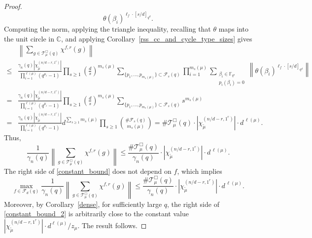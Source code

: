 \documentclass[Unicode,ALCO]{cedram}
\newcommand{\Cbb}{\mathbb{C}}
\newcommand{\F}{\mathbb{F}}
\newcommand{\CF}{\mathcal{F}}
\newcommand{\CT}{\mathcal{T}}
\newcommand{\te}{\theta}
\begin{document}
\begin{proof}
\begin{equation}
\te(\beta_i)^{\ell_f \cdot [s/d]_{q^d}}.
\end{equation}
Computing the norm, applying the triangle inequality, recalling that \(\te\) maps into the unit circle in \(\Cbb\), and applying Corollary~\ref{rss_cc_and_cycle_type_sizes} gives
\begin{align*}
& \left \|
\sum_{g \in \CT^\Box_\mu (q)} \chi^{f,r} (g)
\right \| \\
\leq &
\frac{\gamma_n(q) \left | \chi^{(n/d-r,1^r)}_{\tilde{\mu}} \right |}{\prod_{i=1}^{\ell(\mu)} (q^{\mu_i}-1)}
\prod_{s \geq 1}
\left (
\frac{d}{s}
\right )^{m_s(\mu)}
\sum_{ \{p_1,\ldots,p_{m_s(\mu)}\} \subset \CF_s (q) }
\prod_{i=1}^{m_s(\mu)}
\sum_{\substack{\beta_i \in \F_{q^s} \\ p_i(\beta_i)=0}}
\left \|
\te(\beta_i)^{\ell_f \cdot [s/d]_{q^d}}
\right \| \\
= &
\frac{\gamma_n(q) \left | \chi^{(n/d-r,1^r)}_{\tilde{\mu}} \right |}{\prod_{i=1}^{\ell(\mu)} (q^{\mu_i}-1)}
\prod_{s \geq 1}
\left (
\frac{d}{s}
\right )^{m_s(\mu)}
\sum_{ \{p_1,\ldots,p_{m_s(\mu)}\} \subset \CF_s (q) }
s^{m_s(\mu)} \\
= &
\frac{\gamma_n(q) \left |\chi^{(n/d-r,1^r)}_{\tilde{\mu}} \right |}{\prod_{i=1}^{\ell(\mu)} (q^{\mu_i}-1)}
d^{\sum_{s \geq 1} m_s(\mu)}
\prod_{s \geq 1}
\binom{\# \CF_s (q)}{m_s(\mu)} = \# \CT_\mu^\Box (q) \cdot \left | \chi^{(n/d-r,1^r)}_{\tilde{\mu}} \right | \cdot d^{\, \ell(\mu)}.
\end{align*}
Thus,
\begin{equation}
\label{constant_bound}
\frac{1}{\gamma_n(q)}
\left \|
\sum_{g \in \CT_\mu^\Box (q)} \chi^{f,r} (g)
\right \|
\leq
\frac{\# \CT_\mu^\Box (q)}{
\gamma_n (q)}
\cdot \left | \chi^{(n/d-r,1^r)}_{\tilde{\mu}} \right | \cdot d^{\, \ell(\mu)}.
\end{equation}
The right side of \eqref{constant_bound} does not depend on \(f\), which implies
\begin{equation}
\label{constant_bound_2}
\max_{f \in \CF_d (q)}
\frac{1}{\gamma_n(q)}
\left \|
\sum_{g \in \CT_\mu^\Box (q)} \chi^{f,r} (g)
\right \|
\leq
\frac{\# \CT_\mu^\Box (q)}{
\gamma_n (q)}
\cdot \left | \chi^{(n/d-r,1^r)}_{\tilde{\mu}} \right | \cdot d^{\, \ell(\mu)}.
\end{equation}
Moreover, by Corollary~\ref{dense}, for sufficiently large \(q\), the right side of \eqref{constant_bound_2} is arbitrarily close to the constant value \(|\chi_{\tilde{\mu}}^{(n/d-r,1^r)}| \cdot d^{\ell(\mu)} / z_\mu\).
The result follows.
\end{proof}
\end{document}
